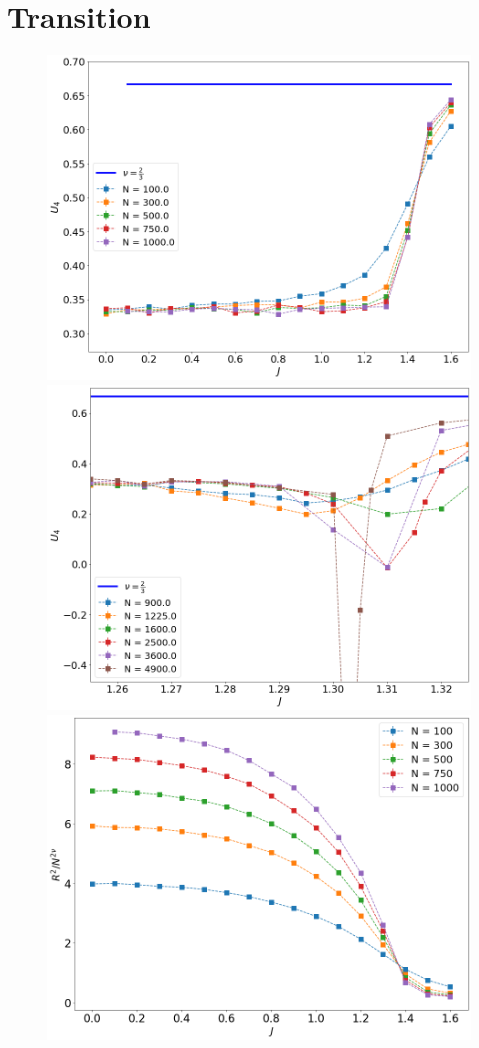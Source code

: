 \section{Transition}
 \begin{figure}[H]
 	\centering
 	\includegraphics[scale=0.23]{Images/bindercumulants_shortchains.png} 	\includegraphics[scale=0.23]{Images/bindercumulants_longchains.png} \\ 
 	 	\includegraphics[scale=0.23]{Images/rscaling_shortchains.png}

\end{figure}
